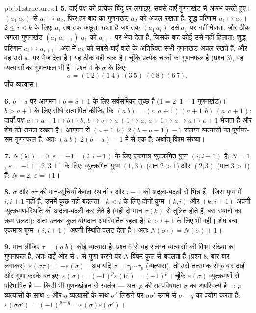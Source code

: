 \begin{solution}{pb:b1:structures:1}
\textbf{5.} दाएँ पक्ष को प्रत्येक बिंदु पर लगाइए, सबसे दाएँ गुणनखंड से आरंभ
करते हुए। $(a_1\ a_2)$ से $a_1 \mapsto a_2$, फिर हर बाद का गुणनखंड $a_2$ को
अचल रखता है: शुद्ध परिणाम $a_1 \mapsto a_2$। $2 \leq i < k$ के लिए: $a_i$ तब
तक अछूता रहता है जब तक $(a_1\ a_i)$ उसे $a_1$ पर नहीं भेजता, और ठीक अगला
गुणनखंड $(a_1\ a_{i+1})$ $a_1$ को $a_{i+1}$ पर भेज देता है, जिसके बाद कोई
उसे नहीं हिलाता: शुद्ध परिणाम $a_i \mapsto a_{i+1}$। अंत में $a_k$ को सबसे
बाएँ वाले के अतिरिक्त सभी गुणनखंड अचल रखते हैं, और वह उसे $a_1$ पर भेज देता
है। यह ठीक वही चक्र है। चूँकि प्रत्येक  चक्रों का गुणनफल है (प्रश्न
3), वह व्यत्यासों का गुणनफल भी है। प्रश्न 4 के $\sigma$ के लिए:
\[
\sigma = (1\ 2)(1\ 4)\;(3\ 5)\;(6\ 8)(6\ 7),
\]
पाँच व्यत्यास।

\textbf{6.} $b - a$ पर आगमन। $b = a + 1$ के लिए सर्वसमिका तुच्छ है ($1 =
2\cdot1 - 1$ गुणनखंड)। $b > a + 1$ के लिए सीधे सत्यापित कीजिए कि $(a\ b) =
(a\ \ a{+}1)\,(a{+}1\ \ b)\,(a\ \ a{+}1)$: दायाँ पक्ष $a \mapsto a{+}1
\mapsto b \mapsto b$, $b \mapsto b \mapsto a{+}1 \mapsto a$, $a{+}1 \mapsto
a \mapsto a \mapsto a{+}1$ भेजता है और शेष को अचल रखता है। आगमन से $(a{+}1\
\ b)$ $2(b - a - 1) - 1$ संलग्न व्यत्यासों का पूर्वापर-सम गुणनफल है, अतः
$(a\ b)$ $2(b - a) - 1$ में से एक है: अर्थात् विषम संख्या।

\textbf{7.} $N(\mathrm{id}) = 0$, $\varepsilon = +1$। $(i\ \ i{+}1)$ के लिए
एकमात्र व्युत्क्रमित युग्म $(i, i+1)$ है: $N = 1$, $\varepsilon = -1$। $[2,
3, 1]$ के लिए: व्युत्क्रमित युग्म $(1, 3)$ (मान $2 > 1$) और $(2, 3)$ (मान $3
> 1$) हैं: $N = 2$, $\varepsilon = +1$।

\textbf{8.} $\sigma$ और $\sigma\tau$ की मान-सूचियाँ केवल स्थानों $i$ और $i +
1$ की अदला-बदली से भिन्न हैं। जिस युग्म में $i, i+1$ नहीं है, उसमें कुछ नहीं
बदलता। $k < i$ के लिए दोनों युग्म $(k, i)$ और $(k, i+1)$ अपनी
व्युत्क्रमण-स्थिति की अदला-बदली कर लेते हैं (वही दो मान $\sigma(k)$ से तुलित
होते हैं, बस स्थानों का क्रम उलटा): अतः उनका कुल योगदान अपरिवर्तित रहता है;
$k > i + 1$ के लिए भी वही। शेष बचा एकमात्र युग्म $(i, i+1)$ अपनी स्थिति पलट
देता है। अतः $N(\sigma\tau) = N(\sigma) \pm 1$।

\textbf{9.} मान लीजिए $\tau = (a\ b)$ कोई व्यत्यास है: प्रश्न 6 से वह संलग्न
व्यत्यासों की विषम संख्या का गुणनफल है, अतः दाईं ओर से $\tau$ से गुणा करने
पर $N$ विषम कुल से बदलता है (प्रश्न 8, बार-बार लगाकर): $\varepsilon(\sigma
\tau) = -\varepsilon(\sigma)$। अब यदि $\sigma = \tau_1\cdots \tau_p$
(व्यत्यास), तो उसे तत्समक से $p$ बार दाईं ओर गुणा करके बनाइए:
$\varepsilon(\sigma) = (-1)^p\varepsilon(\mathrm{id}) = (-1)^p$। चूँकि
$\varepsilon(\sigma)$ व्युत्क्रमणों से परिभाषित है --- किसी भी गुणनखंडन से
स्वतंत्र --- अतः $p$ की सम-विषमता $\sigma$ का अपरिवर्त्य है। : $p$
व्यत्यासों के साथ $\sigma$ और $q$ व्यत्यासों के साथ $\sigma'$ लिखने पर
$\sigma\sigma'$ उनमें से $p + q$ का प्रयोग करता है:
$\varepsilon(\sigma\sigma') = (-1)^{p+q} =
\varepsilon(\sigma)\varepsilon(\sigma')$।


\end{solution}
